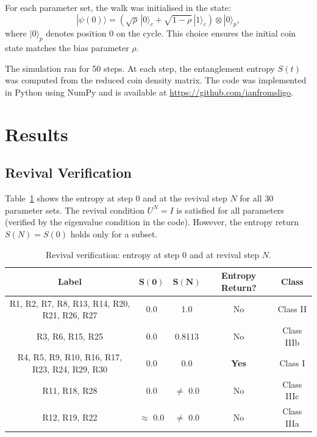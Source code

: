 \documentclass[12pt,a4paper]{article}
\begin{document}
For each parameter set, the walk was initialised in the state:
\begin{equation}
    |\psi(0)\rangle = \left(\sqrt{\rho}\,|0\rangle_c + \sqrt{1-\rho}\,|1\rangle_c\right) \otimes |0\rangle_p,
    \label{eq:init_state}
\end{equation}
where $|0\rangle_p$ denotes position 0 on the cycle. This choice ensures the initial coin state matches the bias parameter $\rho$.

The simulation ran for 50 steps. At each step, the entanglement entropy $S(t)$ was computed from the reduced coin density matrix. The code was implemented in Python using NumPy and is available at \url{https://github.com/ianfromsligo}.

\section{Results}

\subsection{Revival Verification}

Table~\ref{tab:verification} shows the entropy at step 0 and at the revival step $N$ for all 30 parameter sets. The revival condition $U^N = I$ is satisfied for all parameters (verified by the eigenvalue condition in the code). However, the entropy return $S(N) = S(0)$ holds only for a subset.

\begin{table}[H]
\centering
\caption{Revival verification: entropy at step 0 and at revival step $N$.}
\label{tab:verification}
\begin{tabular}{ccccc}
\toprule
\textbf{Label} & $\boldsymbol{S(0)}$ & $\boldsymbol{S(N)}$ & \textbf{Entropy Return?} & \textbf{Class} \\
\midrule
R1, R2, R7, R8, R13, R14, R20, R21, R26, R27 & 0.0 & 1.0 & No  & Class II \\
R3, R6, R15, R25 & 0.0 & 0.8113 & No  & Class IIIb \\
R4, R5, R9, R10, R16, R17, R23, R24, R29, R30 & 0.0 & 0.0 & \textbf{Yes} & Class I \\
R11, R18, R28 & 0.0 & $\neq$ 0.0 & No  & Class IIIc \\
R12, R19, R22 & $\approx$ 0.0 & $\neq$ 0.0 & No  & Class IIIa \\
\bottomrule
\end{tabular}
\end{table}
\end{document}

